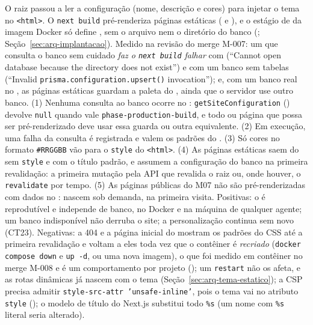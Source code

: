 {O  raiz passou a ler a configuração (nome, descrição e cores) para injetar o tema no \texttt{<html>}. O \texttt{next build} pré-renderiza páginas estáticas (\arq{/} e ), e o estágio de  da imagem Docker só define , sem o arquivo nem o diretório do banco (; Seção~\ref{sec:arq-implantacao}). Medido na revisão do merge M-007: um  que consulta o banco sem cuidado \emph{faz o \texttt{next build} falhar} com  (``Cannot open database because the directory does not exist'') e com um banco sem tabelas (``Invalid \texttt{prisma.configuration.upsert()} invocation''); e, com um banco real no , as páginas estáticas guardam a paleta do , ainda que o servidor use outro banco.}
{(1) Nenhuma consulta ao banco ocorre no : \texttt{getSiteConfiguration} () devolve \texttt{null} quando  vale \texttt{phase-production-build}, e todo  ou página que possa ser pré-renderizado deve usar essa guarda ou outra equivalente. (2) Em execução, uma falha da consulta é registrada e valem os padrões do . (3) Só cores no formato \texttt{\#RRGGBB} vão para o \texttt{style} do \texttt{<html>}. (4) As páginas estáticas saem do  sem \texttt{style} e com o título padrão, e assumem a configuração do banco na primeira revalidação: a primeira mutação pela API que revalida o  raiz ou, onde houver, o \texttt{revalidate} por tempo. (5) As páginas públicas do M07 não são pré-renderizadas com dados no : nascem sob demanda, na primeira visita.}
{Positivas: o  é reprodutível e independe de banco, no Docker e na máquina de qualquer agente; um banco indisponível não derruba o site; a personalização continua sem novo  (CT23). Negativas: a 404 e a página inicial do  mostram os padrões do CSS até a primeira revalidação e voltam a eles toda vez que o contêiner é \emph{recriado} (\texttt{docker compose down} e \texttt{up -d}, ou uma nova imagem), o que foi medido em contêiner no merge M-008 e é um comportamento por projeto (); um \texttt{restart} não os afeta, e as rotas dinâmicas já nascem com o tema (Seção~\ref{sec:arq-tema-estatico}); a CSP precisa admitir \texttt{style-src-attr 'unsafe-inline'}, pois o tema vai no atributo \texttt{style} (); o modelo de título do Next.js substitui todo \texttt{\%s} (um nome com \texttt{\%s} literal seria alterado).}
